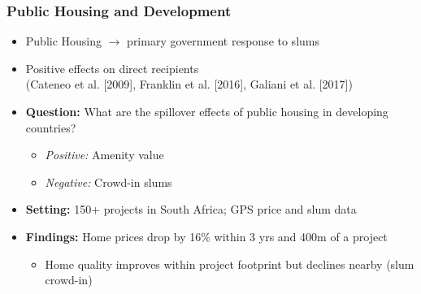 \documentclass[aspectratio=149]{beamer}
\begin{document}
\begin{frame}
\frametitle{Public Housing and Development}


\begin{itemize}
  \item Public Housing $\rightarrow$ primary government response to slums
  \vspace{.1cm}
  \item Positive effects on direct recipients \\ 
  {\footnotesize (Cateneo et al. [2009], Franklin et al. [2016], Galiani et al. [2017])}
  \vspace{.1cm}
  \item \textbf{Question:}  What are the spillover effects of public housing in developing countries?
      \begin{itemize}
      \item \textit{Positive:} Amenity value
      \item \textit{Negative:} Crowd-in slums
    \end{itemize}
  \vspace{.1cm}
  \item \textbf{Setting:} 150+ projects in South Africa; GPS price and slum data
  \vspace{.1cm}
  \item \textbf{Findings:} Home prices drop by 16\% within 3 yrs and 400m of a project
    \begin{itemize}
      \item Home quality improves within project footprint but declines nearby (slum crowd-in)
    \end{itemize}
\end{itemize}


\end{frame}
\end{document}

